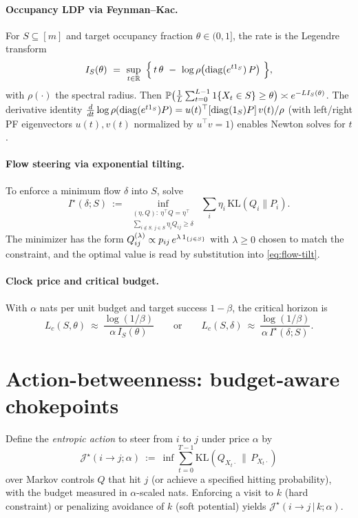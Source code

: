 \documentclass[11pt]{article}
\newcommand{\PP}{\mathbb P}
\newcommand{\RR}{\mathbb R}
\newcommand{\1}{\mathbbm{1}}
\newcommand{\KL}{\mathrm{KL}}
\newcommand{\diag}{\mathrm{diag}}
\theoremstyle{plain}
\theoremstyle{definition}
\begin{document}
\paragraph{Occupancy LDP via Feynman--Kac.}
For $S\subseteq[m]$ and target occupancy fraction $\theta\in(0,1]$, the rate is the Legendre transform
\begin{equation}
\label{eq:IS-theta}
I_S(\theta)\ =\ \sup_{t\in\RR}\ \Big\{\, t\,\theta\ -\ \log \rho\big(\diag(e^{t\1_S})\,P\big)\ \Big\},
\end{equation}
with $\rho(\cdot)$ the spectral radius. Then $\PP\big(\frac1L\sum_{t=0}^{L-1}\1\{X_t\in S\}\ge\theta\big)\asymp e^{-L I_S(\theta)}$. The derivative identity
\(
\frac{d}{dt}\log\rho(\diag(e^{t\1_S})P)=u(t)^\top[\diag(\1_S)P]\,v(t)/\rho
\)
(with left/right PF eigenvectors $u(t),v(t)$ normalized by $u^\top v=1$) enables Newton solves for $t$.

\paragraph{Flow steering via exponential tilting.}
To enforce a minimum flow $\delta$ into $S$, solve
\begin{equation}
\label{eq:flow-tilt}
I^\star(\delta;S)\ :=\ \inf_{\substack{(\eta,Q):\ \eta^\top Q=\eta^\top\\ \sum_{i\notin S,\,j\in S}\eta_i Q_{ij}\ge\delta}}\
\sum_i \eta_i\,\KL(Q_i\|P_i).
\end{equation}
The minimizer has the form $Q^{(\lambda)}_{ij}\propto p_{ij}\,e^{\lambda\,\1_{\{j\in S\}}}$ with $\lambda\ge0$ chosen to match the constraint, and the optimal value is read by substitution into \eqref{eq:flow-tilt}.

\paragraph{Clock price and critical budget.}
With $\alpha$ nats per unit budget and target success $1-\beta$, the critical horizon is
\begin{equation}
\label{eq:Lc}
L_c(S,\theta)\ \approx\ \frac{\log(1/\beta)}{\alpha\, I_S(\theta)}\qquad\text{or}\qquad
L_c(S,\delta)\ \approx\ \frac{\log(1/\beta)}{\alpha\, I^\star(\delta;S)}.
\end{equation}

\section{Action-betweenness: budget-aware chokepoints}
\label{sec:ab}
Define the \emph{entropic action} to steer from $i$ to $j$ under price $\alpha$ by
\begin{equation}
\mathcal J^\star(i\!\to\! j;\alpha)\ :=\ \inf \sum_{t=0}^{T-1}\KL(Q_{X_t\cdot}\,\|\,P_{X_t\cdot})
\end{equation}
over Markov controls $Q$ that hit $j$ (or achieve a specified hitting probability), with the budget measured in $\alpha$-scaled nats. Enforcing a visit to $k$ (hard constraint) or penalizing avoidance of $k$ (soft potential) yields $\mathcal J^\star(i\!\to\! j\,|\,k;\alpha)$.
\end{document}

